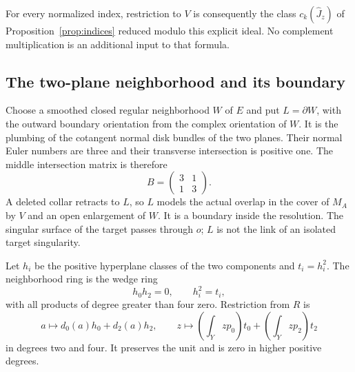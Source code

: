 For every normalized index, restriction to $V$ is consequently
the class $c_k(\widehat J_z)$ of Proposition~\ref{prop:indices}
reduced modulo this explicit ideal. No complement multiplication
is an additional input to that formula.

\subsection{The two-plane neighborhood and its boundary}
Choose a smoothed closed regular neighborhood $W$ of $E$ and
put $L=\partial W$, with the outward boundary orientation from
the complex orientation of $W$. It is the plumbing of the
cotangent normal disk bundles of the two planes. Their normal
Euler numbers are three and their transverse intersection is
positive one. The middle intersection matrix is therefore
\begin{equation}\label{eq:B}
 B=\begin{pmatrix}3&1\\1&3\end{pmatrix}.
\end{equation}
A deleted collar retracts to $L$, so $L$ models the actual
overlap in the cover of $M_A$ by $V$ and an open enlargement
of $W$. It is a boundary inside the resolution. The singular
surface of the target passes through $o$; $L$ is not the link
of an isolated target singularity.

Let $h_i$ be the positive hyperplane classes of the two
components and $t_i=h_i^2$. The neighborhood ring is the
wedge ring
\begin{equation}\label{eq:W-ring}
 h_0h_2=0,\qquad h_i^2=t_i,
\end{equation}
with all products of degree greater than four zero.
Restriction from $R$ is
\begin{equation}\label{eq:W-restrictions}
 a\longmapsto d_0(a)h_0+d_2(a)h_2,\qquad
 z\longmapsto\left(\int_Yzp_0\right)t_0+
                    \left(\int_Yzp_2\right)t_2
\end{equation}
in degrees two and four. It preserves the unit and is zero
in higher positive degrees.

